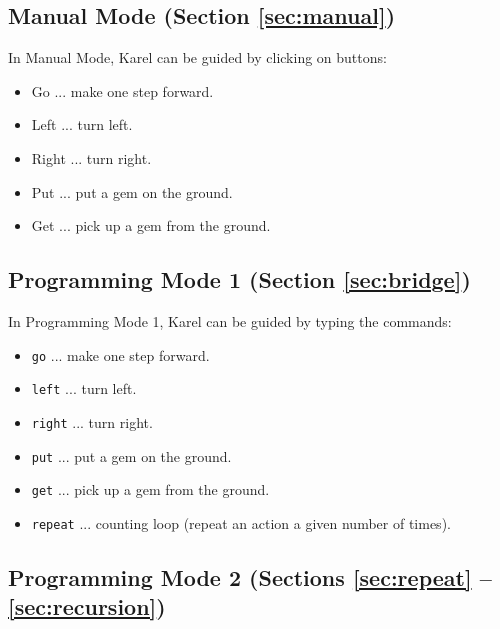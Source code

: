 \subsection[\ \ Manual Mode (Section \ref{sec:manual})]{Manual Mode (Section \ref{sec:manual})}

In Manual Mode, Karel can be guided by clicking on buttons:
\begin{itemize}
\item Go ... make one step forward.
\item Left ... turn left.
\item Right ... turn right.
\item Put ... put a gem on the ground.
\item Get ... pick up a gem from the ground.
\end{itemize}

\subsection[\ \ Programming Mode 1 (Section \ref{sec:bridge})]{Programming Mode 1 (Section \ref{sec:bridge})}

In Programming Mode 1, Karel can be guided by typing the commands:
\begin{itemize}
\item {\tt go} ... make one step forward.
\item {\tt left} ... turn left.
\item {\tt right} ... turn right.
\item {\tt put} ... put a gem on the ground.
\item {\tt get} ... pick up a gem from the ground.
\item {\tt repeat} ... counting loop (repeat an action a given number of times).
\end{itemize}

\subsection[\ \ Programming Mode 2 (Sections \ref{sec:repeat} -- \ref{sec:recursion})]{Programming Mode 2 (Sections \ref{sec:repeat} -- \ref{sec:recursion})}

